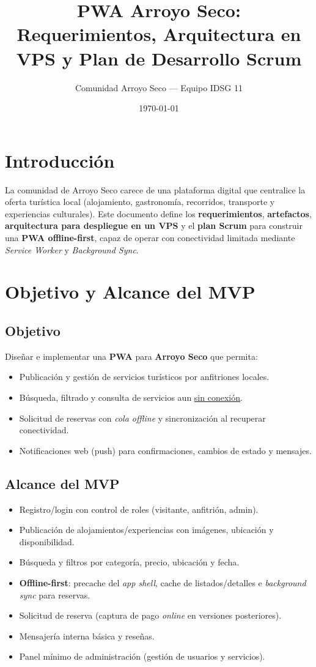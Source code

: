 \documentclass[12pt]{article}
\title{PWA Arroyo Seco: Requerimientos, Arquitectura en VPS y Plan de Desarrollo Scrum}
\author{Comunidad Arroyo Seco — Equipo IDSG 11}
\date{\today}
\begin{document}
\maketitle
\tableofcontents

\section{Introducción}
La comunidad de Arroyo Seco carece de una plataforma digital que centralice la oferta turística local (alojamiento, gastronomía, recorridos, transporte y experiencias culturales). Este documento define los \textbf{requerimientos}, \textbf{artefactos}, \textbf{arquitectura para despliegue en un VPS} y el \textbf{plan Scrum} para construir una \textbf{PWA offline-first}, capaz de operar con conectividad limitada mediante \textit{Service Worker} y \textit{Background Sync}.

\section{Objetivo y Alcance del MVP}
\subsection{Objetivo}
Diseñar e implementar una \textbf{PWA} para \textbf{Arroyo Seco} que permita:
\begin{itemize}[nosep]
  \item Publicación y gestión de servicios turísticos por anfitriones locales.
  \item Búsqueda, filtrado y consulta de servicios aun \underline{sin conexión}.
  \item Solicitud de reservas con \textit{cola offline} y sincronización al recuperar conectividad.
  \item Notificaciones web (push) para confirmaciones, cambios de estado y mensajes.
\end{itemize}

\subsection{Alcance del MVP}
\begin{itemize}[nosep]
  \item Registro/login con control de roles (visitante, anfitrión, admin).
  \item Publicación de alojamientos/experiencias con imágenes, ubicación y disponibilidad.
  \item Búsqueda y filtros por categoría, precio, ubicación y fecha.
  \item \textbf{Offline-first}: precache del \textit{app shell}, cache de listados/detalles e \textit{background sync} para reservas.
  \item Solicitud de reserva (captura de pago \emph{online} en versiones posteriores).
  \item Mensajería interna básica y reseñas.
  \item Panel mínimo de administración (gestión de usuarios y servicios).
\end{itemize}
\end{document}
